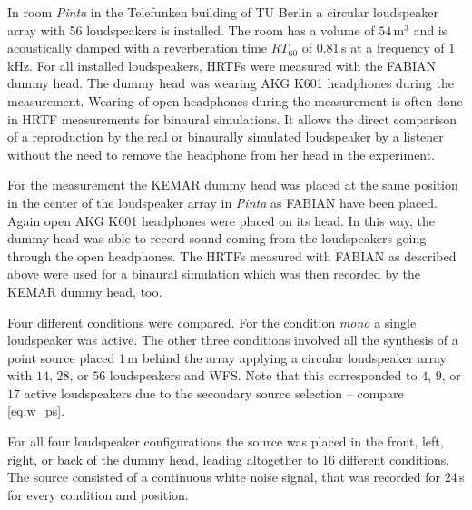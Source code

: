 %
In room \emph{Pinta} in the Telefunken building of {\small TU} Berlin a circular
loudspeaker array with 56 loudspeakers is installed. The room has a volume of
$54$\,m$^3$ and is acoustically damped with a reverberation time $RT_{60}$ of 
$0.81$\,s at a frequency of $1$\,kHz.
For all installed loudspeakers, \acp{HRTF} were measured with the {\small FABIAN} dummy
head\autocite[The measurements were performed by Alexander Lindau, the used
dummy head is described in][]{Lindau2007a}.
The dummy head was wearing {\small AKG K601} headphones
during the measurement. Wearing of open headphones during the measurement
is often done in \ac{HRTF} measurements for binaural
simulations. It allows the direct comparison of a reproduction by the real
or binaurally simulated loudspeaker by a listener without the need to remove the
headphone from her head in the experiment.\autocite[An example of 
verifying binaural synthesis is presented in][]{Lindau2012}

For the measurement the {\small KEMAR} dummy head was placed at the same
position in the center of the loudspeaker array in \emph{Pinta} as {\small
FABIAN} have been placed. Again open
{\small AKG K601} headphones were placed on its head. In this way,
the dummy head was able to
record sound coming from the loudspeakers going through the open headphones.
The \acp{HRTF} measured with {\small FABIAN} as described above were
used for a binaural simulation
which was then recorded by the {\small KEMAR} dummy head, too.

Four different conditions were compared. For the condition
\emph{mono} a single loudspeaker was active. The other three conditions involved
all the synthesis of a point source placed $1$\,m behind the array applying a
circular loudspeaker array with $14$, $28$, or $56$ loudspeakers and \ac{WFS}.
Note that
this corresponded to $4$, $9$, or $17$ active loudspeakers due to the secondary
source selection -- compare \eqref{eq:w_ps}.

For all four loudspeaker configurations the source was placed in the front, left,
right, or back of the dummy head, leading altogether to 16 different conditions.
The source consisted of a continuous white noise signal, that was
recorded for $24$\,s for every condition and position.


